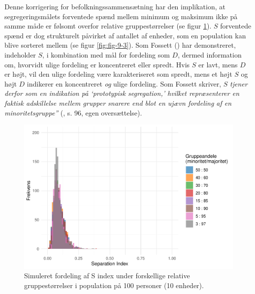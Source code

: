 \documentclass[
]{book}
\begin{document}
Denne korrigering for befolkningssammensætning har den implikation, at segregeringsmålets forventede spænd mellem minimum og maksimum ikke på samme måde er følsomt overfor relative gruppestørrelser (se figur \ref{fig:fig-9-2}). \(S\) forventede spænd er dog strukturelt påvirket af antallet af enheder, som en population kan blive sorteret mellem (se figur \ref{fig:fig-9-3}). Som Fossett () har demonstreret, indeholder \(S\), i kombination med mål for fordeling som \(D\), dermed information om, hvorvidt ulige fordeling er koncentreret eller spredt. Hvis \(S\) er lavt, mens \(D\) er højt, vil den ulige fordeling være karakteriseret som spredt, mens et højt \(S\) og højt \(D\) indikerer en koncentreret \emph{og} ulige fordeling. Som Fossett skriver, \(S\) \emph{tjener derfor som en indikation på `prototypisk segregation,' hvilket repræsenterer en faktisk adskillelse mellem grupper snarere end blot en ujævn fordeling af en minoritetsgruppe''} (, s. 96, egen oversættelse).

\begin{figure}
\includegraphics[width=1\linewidth]{en-befolkning-blander-sig_files/figure-latex/fig-9-2-1} \caption{Simuleret fordeling af S index under forskellige relative gruppestørrelser i population på 100 personer (10 enheder).}\label{fig:fig-9-2}
\end{figure}
\end{document}
